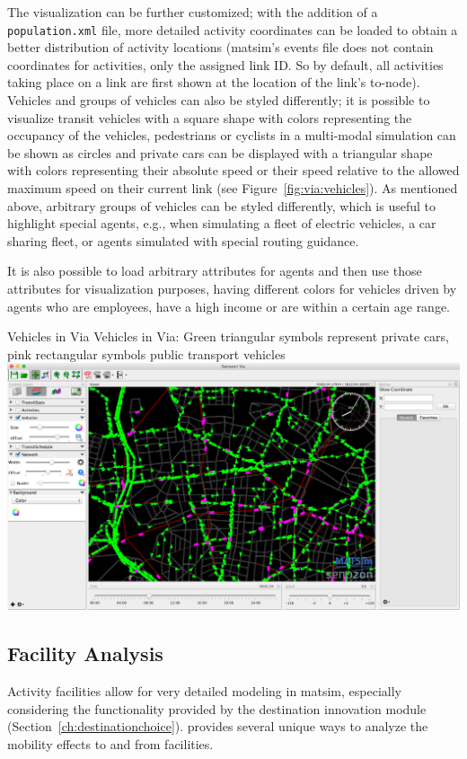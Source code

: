 The visualization can be further customized; with the addition of
 a \lstinline|population.xml| file, more detailed activity coordinates can be loaded to obtain a
better distribution of activity locations (\gls{matsim}'s events file does not
contain coordinates for activities, only the assigned link ID. So by default,
all activities taking place on a link are first shown at the location of
the link's to-node).  Vehicles and groups of vehicles can also be styled
differently; it is possible to visualize transit vehicles with a square shape
with colors representing the occupancy of the vehicles, pedestrians or
cyclists in a multi-modal simulation can be shown as circles and private cars
can be displayed with a triangular shape with colors representing their
absolute speed or their speed relative to the allowed maximum speed on their current link
 (see Figure~\ref{fig:via:vehicles}). As mentioned above, arbitrary
groups of vehicles can be styled differently, which is useful to highlight
special agents, e.g., when simulating a fleet of electric vehicles, a car sharing
fleet, or agents simulated with special routing guidance.

It is also possible to load arbitrary attributes for agents and then use those attributes
for visualization purposes, \eg having different colors for vehicles
driven by agents who are employees, have a high income or are within a certain
age range.

\createfigure%
{Vehicles in Via}%
{Vehicles in Via: Green triangular symbols represent private cars, pink rectangular symbols public transport vehicles }%
{\label{fig:via:vehicles}}%
{\includegraphics[width=1.\textwidth,angle=0]{./extending/figures/via/vehicles}}%
{}

\subsection{Facility Analysis}
Activity facilities allow for very detailed modeling in \gls{matsim}, especially
considering the functionality provided by the destination innovation \gls{module}
(Section~\ref{ch:destinationchoice}). \Via{} provides several unique ways to
analyze the mobility effects to and from facilities.

